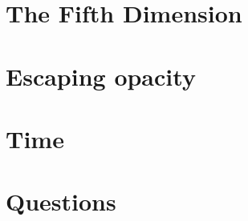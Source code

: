 \documentclass{tufte-VDQI}
\begin{document}
\dominitoc


\mainmatter

\nopartblankpage
\part{The Fifth Dimension}





\part{Escaping opacity}




\part{Time}




\part{Questions}



\backmatter

\printbibliography[heading=bibliographypart]
\end{document}
